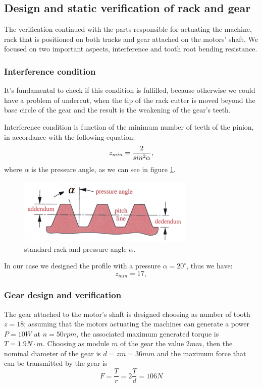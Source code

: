 \subsection{Design and static verification of rack and gear}
The verification continued with the parts responsible for actuating the machine, rack that is positioned on both tracks and gear attached on the motors' shaft.
We focused on two important aspects, interference and tooth root bending resistance.

\subsubsection*{Interference condition}
It's fundamental to check if this condition is fulfilled, because otherwise we could have a problem of undercut, when the tip of the rack cutter is moved beyond the base circle of the gear and the result is the weakening of the gear's teeth.

Interference condition is function of the minimum number of teeth of the pinion, in accordance with the following equation:
\begin{equation}
	\centering
	z_{min} = \frac{2}{sin^2\alpha},
\end{equation}
where $\alpha$ is the pressure angle, as we can see in figure \ref{fig:rack}.
\begin{figure}
	\centering
	\includegraphics[scale=1]{Images/rack.png}
	\caption{standard rack and pressure angle $\alpha$.}
	\label{fig:rack}
\end{figure}
In our case we designed the profile with a pressure $\alpha = 20^\circ$, thus we have:
\begin{equation*}
	z_{min} = 17,
\end{equation*}

\subsubsection*{Gear design and verification}
	The gear attached to the motor's shaft is designed choosing as number of tooth $z=18$; assuming that the motors actuating the machines can generate a power $P=10W$ at $n = 50rpm$, the associated maximum generated torque is $T=1.9N\cdot m$. Choosing as module $m$ of the gear the value $2mm$, then the nominal diameter of the gear is $d = zm = 36mm$ and the maximum force that can be transmitted by the gear is
	\[ F = \frac T r = 2 \frac T d = 106N\]
	
